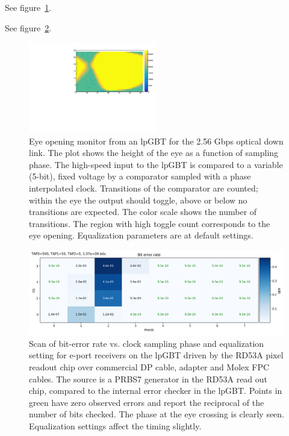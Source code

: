 \documentclass[a4paper,11pt]{article}
\begin{document}
See figure~\ref{fig:lpgbt_eye}.

See figure~\ref{fig:lpgbt_bert}.

\begin{figure}[htbp]
\centering
\includegraphics[width=0.5\textwidth,origin=c]{../figures/lpGBT_eye.pdf}
\caption{
\label{fig:lpgbt_eye}
Eye opening monitor from an lpGBT for the 2.56 Gbps optical down link.
The plot shows the height of the eye as a function of sampling phase.
The high-speed input to the lpGBT is compared to a variable (5-bit), fixed voltage by a comparator sampled with a phase interpolated clock.
Transitions of the comparator are counted; within the eye the output should toggle, above or below no transitions are expected.
The color scale shows the number of transitions.
The region with high toggle count corresponds to the eye opening.
Equalization parameters are at default settings.
}
\end{figure}

\begin{figure}[htbp]
\centering
\includegraphics[width=1.0\textwidth,origin=c]{../figures/lpGBT_bert.png}
\caption{
\label{fig:lpgbt_bert}
Scan of bit-error rate vs. clock sampling phase and equalization setting for e-port receivers on the lpGBT driven by the RD53A pixel readout chip over commercial DP cable, adapter and Molex FPC cables.
The source is a PRBS7 generator in the RD53A read out chip, compared to the internal error checker in the lpGBT.
Points in green have zero observed errors and report the reciprocal of the number of bits checked.
The phase at the eye crossing is clearly seen.
Equalization settings affect the timing slightly.
}
\end{figure}
\end{document}
